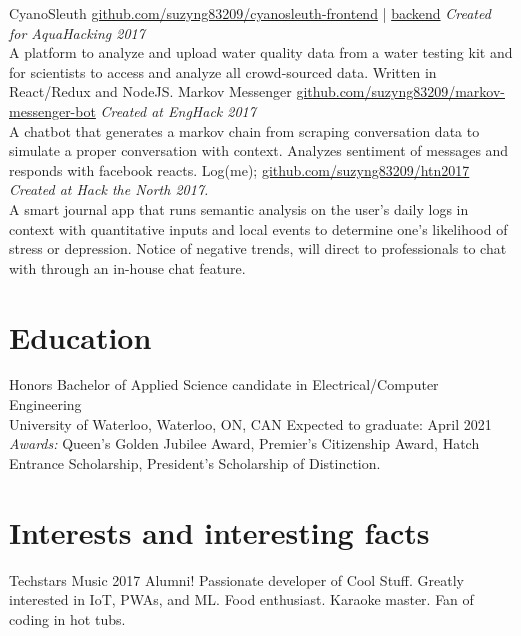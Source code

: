 \documentclass[]{friggeri-cv}
\begin{document}
\begin{entrylist}
	\entry
	{CyanoSleuth}
	{\href{https://github.com/suzyng83209/cyanosleuth-frontend}{github.com/suzyng83209/cyanosleuth-frontend} | \href{https://github.com/suzyng83209/cyanosleuth-backend}{backend}}
	{\emph{Created for AquaHacking 2017} \\
		A platform to analyze and upload water quality data from a water testing kit and for scientists to access and analyze all crowd-sourced data. Written in React/Redux and NodeJS.
	}
	\entry
	{Markov Messenger}
	{\href{https://github.com/suzyng83209/markov-messenger-bot}{github.com/suzyng83209/markov-messenger-bot}}
	{\emph{Created at EngHack 2017} \\
		A chatbot that generates a markov chain from scraping conversation data to simulate a proper conversation with context. Analyzes sentiment of messages and responds with facebook reacts.}
	\entry
	{Log(me);}
	{\href{https://github.com/suzyng83209/htn2017}{github.com/suzyng83209/htn2017}}
	{\emph{Created at Hack the North 2017.} \\
		A smart journal app that runs semantic analysis on the user's daily logs in context with quantitative inputs and local events to determine one's likelihood of stress or depression. Notice of negative trends, will direct to professionals to chat with through an in-house chat feature.}
\end{entrylist}

\section{Education}

\begin{entrylist}
	\entry
	{Honors Bachelor of Applied Science {\normalfont candidate in Electrical/Computer Engineering}}
	{\\ University of Waterloo, Waterloo, ON, CAN}
	{Expected to graduate: April 2021 \\
		\emph{Awards:} Queen's Golden Jubilee Award, Premier's Citizenship Award, Hatch Entrance Scholarship, President's Scholarship of Distinction.}
\end{entrylist}

\section{Interests and interesting facts}

Techstars Music 2017 Alumni! Passionate developer of Cool Stuff\texttrademark. Greatly interested in IoT, PWAs, and ML. Food enthusiast. Karaoke master. Fan of coding in hot tubs.
\end{document}
